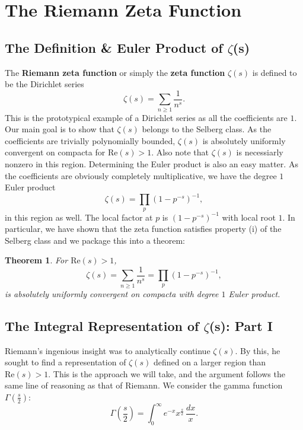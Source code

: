 \documentclass[12pt]{book}
\newtheorem{theorem}{Theorem}[section]
\theoremstyle{definition}\newframedtheorem{method}{Method}
\newcommand{\z}{\zeta}
\newcommand{\G}{\Gamma}
\newcommand{\<}{\langle}
\renewcommand{\>}{\rangle}
\renewcommand{\Re}{\mathrm{Re}}
\begin{document}
  \section{The Riemann Zeta Function}\label{sec:The_Riemann_Zeta_Function}
    \subsection*{The Definition \& Euler Product of \texorpdfstring{$\z$}{z}(s)}
      The \textbf{Riemann zeta function} or simply the \textbf{zeta function} $\z(s)$ is defined to be the Dirichlet series
      \[
        \z(s) = \sum_{n \ge 1}\frac{1}{n^{s}}.
      \]
      This is the prototypical example of a Dirichlet series as all the coefficients are $1$. Our main goal is to show that $\z(s)$ belongs to the Selberg class. As the coefficients are trivially polynomially bounded, $\z(s)$ is absolutely uniformly convergent on compacta for $\Re(s) > 1$. Also note that $\z(s)$ is necessiarly nonzero in this region. Determining the Euler product is also an easy matter. As the coefficients are obviously completely multiplicative, we have the degree $1$ Euler product
      \[
        \z(s) = \prod_{p}(1-p^{-s})^{-1},
      \]
      in this region as well. The local factor at $p$ is $(1-p^{-s})^{-1}$ with local root $1$. In particular, we have shown that the zeta function satisfies property (i) of the Selberg class and we package this into a theorem:

      \begin{theorem}
        For $\Re(s) > 1$,
        \[
          \z(s) = \sum_{n \ge 1}\frac{1}{n^{s}} = \prod_{p}(1-p^{-s})^{-1},
        \]
        is absolutely uniformly convergent on compacta with degree $1$ Euler product.
      \end{theorem}
    \subsection*{The Integral Representation of \texorpdfstring{$\z$}{z}(s): Part I}
      Riemann's ingenious insight was to analytically continue $\z(s)$. By this, he sought to find a representation of $\z(s)$ defined on a larger region than $\Re(s) > 1$. This is the approach we will take, and the argument follows the same line of reasoning as that of Riemann. We consider the gamma function $\G\left(\frac{s}{2}\right)$:
      \[
        \G\left(\frac{s}{2}\right) = \int_{0}^{\infty}e^{-x}x^{\frac{s}{2}}\,\frac{dx}{x}.
      \]
\end{document}
